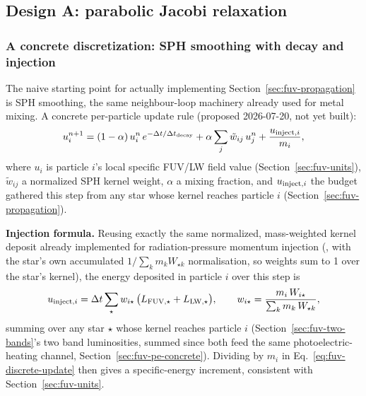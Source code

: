 \subsection{Design A: parabolic Jacobi relaxation}
\label{sec:fuv-design-a}

\subsubsection{A concrete discretization: SPH smoothing with decay and
injection}
\label{sec:fuv-discretization}

The naive starting point for actually implementing
Section~\ref{sec:fuv-propagation} is SPH smoothing, the same
neighbour-loop machinery already used for metal mixing. A concrete
per-particle update rule (proposed 2026-07-20, not yet built):
\begin{equation}
  u_i^{n+1} = (1-\alpha)\,u_i^n\,e^{-\Delta t/\Delta t_{\rm decay}}
    + \alpha\sum_j \tilde w_{ij}\,u_j^n
    + \frac{u_{{\rm inject},i}}{m_i} ,
  \label{eq:fuv-discrete-update}
\end{equation}
where $u_i$ is particle $i$'s local specific FUV/LW field value
(Section~\ref{sec:fuv-units}), $\tilde w_{ij}$ a normalized SPH kernel
weight, $\alpha$ a mixing fraction, and $u_{{\rm inject},i}$ the budget
gathered this step from any star whose kernel reaches particle $i$
(Section~\ref{sec:fuv-propagation}).

\textbf{Injection formula.} Reusing exactly the same normalized,
mass-weighted kernel deposit
already implemented for radiation-pressure momentum injection
(, 
with  the star's own accumulated
$1/\sum_k m_k W_{\star k}$ normalisation, so weights sum to 1 over the
star's kernel), the energy deposited in particle $i$ over this step is
\begin{equation}
  u_{{\rm inject},i} = \Delta t \sum_\star w_{i\star}\,
    \big(L_{\rm FUV,\star}+L_{\rm LW,\star}\big) ,
  \qquad
  w_{i\star} = \frac{m_i\,W_{i\star}}{\sum_k m_k\,W_{\star k}} ,
  \label{eq:fuv-inject}
\end{equation}
summing over any star $\star$ whose kernel reaches particle $i$
(Section~\ref{sec:fuv-two-bands}'s two band luminosities, summed since
both feed the same photoelectric-heating channel,
Section~\ref{sec:fuv-pe-concrete}). Dividing by $m_i$ in
Eq.~\ref{eq:fuv-discrete-update} then gives a specific-energy
increment, consistent with Section~\ref{sec:fuv-units}.

